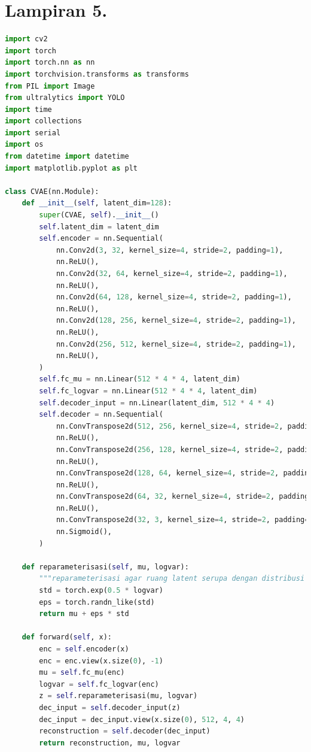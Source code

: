 \section*{Lampiran 5. }
\label{Lampiran 5}
\begin{lstlisting}[language=Python]
import cv2
import torch
import torch.nn as nn
import torchvision.transforms as transforms
from PIL import Image
from ultralytics import YOLO
import time
import collections
import serial
import os
from datetime import datetime
import matplotlib.pyplot as plt

class CVAE(nn.Module):
    def __init__(self, latent_dim=128):
        super(CVAE, self).__init__()
        self.latent_dim = latent_dim
        self.encoder = nn.Sequential(
            nn.Conv2d(3, 32, kernel_size=4, stride=2, padding=1),
            nn.ReLU(),
            nn.Conv2d(32, 64, kernel_size=4, stride=2, padding=1),
            nn.ReLU(),
            nn.Conv2d(64, 128, kernel_size=4, stride=2, padding=1),
            nn.ReLU(),
            nn.Conv2d(128, 256, kernel_size=4, stride=2, padding=1),
            nn.ReLU(),
            nn.Conv2d(256, 512, kernel_size=4, stride=2, padding=1),
            nn.ReLU(),
        )
        self.fc_mu = nn.Linear(512 * 4 * 4, latent_dim)
        self.fc_logvar = nn.Linear(512 * 4 * 4, latent_dim)
        self.decoder_input = nn.Linear(latent_dim, 512 * 4 * 4)
        self.decoder = nn.Sequential(
            nn.ConvTranspose2d(512, 256, kernel_size=4, stride=2, padding=1),
            nn.ReLU(),
            nn.ConvTranspose2d(256, 128, kernel_size=4, stride=2, padding=1),
            nn.ReLU(),
            nn.ConvTranspose2d(128, 64, kernel_size=4, stride=2, padding=1),
            nn.ReLU(),
            nn.ConvTranspose2d(64, 32, kernel_size=4, stride=2, padding=1),
            nn.ReLU(),
            nn.ConvTranspose2d(32, 3, kernel_size=4, stride=2, padding=1),
            nn.Sigmoid(),
        )

    def reparameterisasi(self, mu, logvar):
        """reparameterisasi agar ruang latent serupa dengan distribusi gaussian."""
        std = torch.exp(0.5 * logvar)
        eps = torch.randn_like(std)
        return mu + eps * std

    def forward(self, x):
        enc = self.encoder(x)
        enc = enc.view(x.size(0), -1)
        mu = self.fc_mu(enc)
        logvar = self.fc_logvar(enc)
        z = self.reparameterisasi(mu, logvar)
        dec_input = self.decoder_input(z)
        dec_input = dec_input.view(x.size(0), 512, 4, 4)
        reconstruction = self.decoder(dec_input)
        return reconstruction, mu, logvar


\end{lstlisting}
